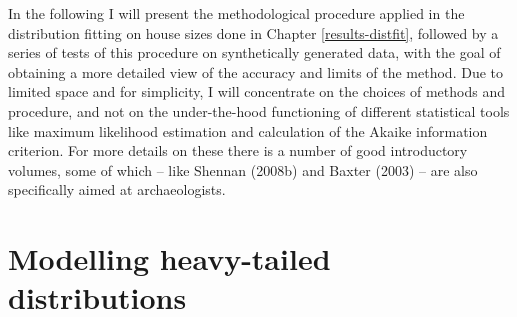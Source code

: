 \documentclass[
  12pt,
  a4paper, twoside]{book}
\begin{document}
In the following I will present the methodological procedure applied in the distribution fitting on house sizes done in Chapter \ref{results-distfit}, followed by a series of tests of this procedure on synthetically generated data, with the goal of obtaining a more detailed view of the accuracy and limits of the method. Due to limited space and for simplicity, I will concentrate on the choices of methods and procedure, and not on the under-the-hood functioning of different statistical tools like maximum likelihood estimation and calculation of the Akaike information criterion. For more details on these there is a number of good introductory volumes, some of which -- like Shennan (2008b) and Baxter (2003) -- are also specifically aimed at archaeologists.

\hypertarget{modelling-heavy-tailed-distributions}{%
\section{Modelling heavy-tailed distributions}\label{modelling-heavy-tailed-distributions}}
\end{document}
